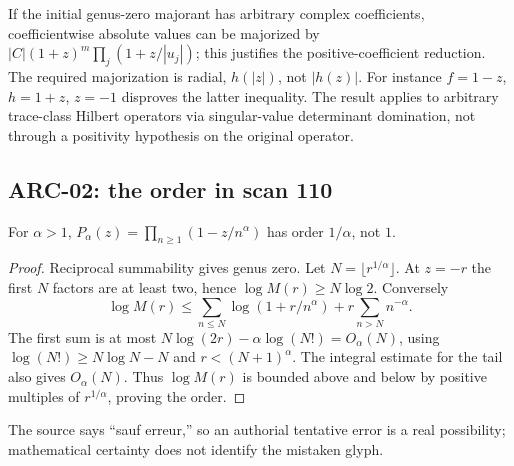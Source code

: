 If the initial genus-zero majorant has arbitrary complex coefficients, coefficientwise absolute values can be majorized by
$|C|(1+z)^m\prod_j(1+z/|u_j|)$; this justifies the positive-coefficient reduction. The required majorization is radial, $h(|z|)$, not $|h(z)|$. For instance $f=1-z$, $h=1+z$, $z=-1$ disproves the latter inequality. The result applies to arbitrary trace-class Hilbert operators via singular-value determinant domination, not through a positivity hypothesis on the original operator.

\subsection{ARC-02: the order in scan 110}
For $\alpha>1$, $P_\alpha(z)=\prod_{n\ge1}(1-z/n^\alpha)$ has order $1/\alpha$, not $1$.
\begin{proof}
Reciprocal summability gives genus zero. Let $N=\lfloor r^{1/\alpha}\rfloor$. At $z=-r$ the first $N$ factors are at least two, hence $\log M(r)\ge N\log2$. Conversely
\[
 \log M(r)\le \sum_{n\le N}\log(1+r/n^\alpha)+r\sum_{n>N}n^{-\alpha}.
\]
The first sum is at most $N\log(2r)-\alpha\log(N!)=O_\alpha(N)$, using $\log(N!)\ge N\log N-N$ and $r<(N+1)^\alpha$. The integral estimate for the tail also gives $O_\alpha(N)$. Thus $\log M(r)$ is bounded above and below by positive multiples of $r^{1/\alpha}$, proving the order.
\end{proof}
The source says ``sauf erreur,'' so an authorial tentative error is a real possibility; mathematical certainty does not identify the mistaken glyph.

